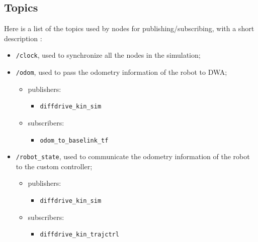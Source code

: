 \documentclass[11pt,a4paper]{article}
\begin{document}

\subsection{Topics}

Here is a list of the topics used by nodes for publishing/subscribing, with a short description :\\

\begin{itemize}

    \item \texttt{/clock}, used to synchronize all the nodes in the simulation;

    \item \texttt{/odom}, used to pass the odometry information of the robot to DWA;
        \begin{itemize}
            \item publishers:
                \begin{itemize}
                    \item \texttt{diffdrive\_kin\_sim}
                \end{itemize}
            \item subscribers:
                \begin{itemize}
                    \item \texttt{odom\_to\_baselink\_tf}
                \end{itemize}
        \end{itemize}

    \item \texttt{/robot\_state}, used to communicate the odometry information of the robot to the custom controller;
        \begin{itemize}
            \item publishers:
                \begin{itemize}
                    \item \texttt{diffdrive\_kin\_sim}
                \end{itemize}
            \item subscribers:
                \begin{itemize}
                    \item \texttt{diffdrive\_kin\_trajctrl}
                \end{itemize}
        \end{itemize}


\end{itemize}
\end{document}
